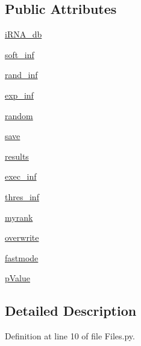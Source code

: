 \subsection*{\-Public \-Attributes}
\begin{DoxyCompactItemize}
\item 
\hyperlink{classirna_1_1iRNA__stat_1_1Files_1_1Files_a07eb296378b4298cd1ef40353b732864}{i\-R\-N\-A\-\_\-db}
\item 
\hyperlink{classirna_1_1iRNA__stat_1_1Files_1_1Files_ae0745b17e9691a7c38b1ef2500277f0c}{soft\-\_\-inf}
\item 
\hyperlink{classirna_1_1iRNA__stat_1_1Files_1_1Files_ab770c1ed785dedb68d9f31fb12c44223}{rand\-\_\-inf}
\item 
\hyperlink{classirna_1_1iRNA__stat_1_1Files_1_1Files_a32705d9dc58c6a688ba3c5c817ffc682}{exp\-\_\-inf}
\item 
\hyperlink{classirna_1_1iRNA__stat_1_1Files_1_1Files_ac45327b78825a0f259ac8fcbfb0ed233}{random}
\item 
\hyperlink{classirna_1_1iRNA__stat_1_1Files_1_1Files_a0200392e1b9b61bf45cc701fd263d895}{save}
\item 
\hyperlink{classirna_1_1iRNA__stat_1_1Files_1_1Files_aa8bc7f113fa3ee1a9e5b2a272ced9f17}{results}
\item 
\hyperlink{classirna_1_1iRNA__stat_1_1Files_1_1Files_a99f3e2f426de140f1bbd8e9d2cce91ca}{exec\-\_\-inf}
\item 
\hyperlink{classirna_1_1iRNA__stat_1_1Files_1_1Files_a22f6ab32da58f1d3b81180087ff4a2cc}{thres\-\_\-inf}
\item 
\hyperlink{classirna_1_1iRNA__stat_1_1Files_1_1Files_a98828dcf876bccd508c70d07d3341672}{myrank}
\item 
\hyperlink{classirna_1_1iRNA__stat_1_1Files_1_1Files_aae47bf5a138f0f2ee3b447e203b52c00}{overwrite}
\item 
\hyperlink{classirna_1_1iRNA__stat_1_1Files_1_1Files_a529063572221b6a7c72ad0045e7dfb7c}{fastmode}
\item 
\hyperlink{classirna_1_1iRNA__stat_1_1Files_1_1Files_a79e2c8e7aac74703100b32adef56b5f7}{p\-Value}
\end{DoxyCompactItemize}


\subsection{\-Detailed \-Description}


\-Definition at line 10 of file \-Files.\-py.



